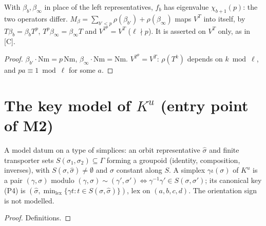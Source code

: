 \begin{proposition}\label{prop:bdrychar-2}
  \leanok
  With $\beta_b,\beta_\infty$ in place of the left representatives, $f_b$ has eigenvalue $\chi_{b+1}(p)$: the two operators
  differ. $M_\beta=\sum_{b'<p}\rho(\beta_{b'})+\rho(\beta_\infty)$ maps $V^T$ into itself, by $T\beta_b=\beta_bT^p$,
  $T^p\beta_\infty=\beta_\infty T$ and $V^{T^p}=V^T$ ($\ell\nmid p$). It is asserted on $V^T$ only, as in [C].
\end{proposition}
\begin{proof}
  \leanok
  $\beta_{b'}\cdot\mathrm{Nm}=p\,\mathrm{Nm}$, $\beta_\infty\cdot\mathrm{Nm}=\mathrm{Nm}$. $V^{T^p}=V^T$: $\rho(T^k)$ depends on $k\bmod\ell$, and
  $pa\equiv1\bmod\ell$ for some $a$.
\end{proof}

\section{The key model of $K^u$ (entry point of M2)}

\begin{definition}\label{def:keymodel}
  \leanok
  A model datum on a type of simplices: an orbit representative $\hat\sigma$ and finite transporter sets
  $S(\sigma_1,\sigma_2)\subseteq\Gamma$ forming a groupoid (identity, composition, inverses), with $S(\sigma,\hat\sigma)\ne\emptyset$ and
  $\hat\sigma$ constant along $S$. A simplex $\gamma\iota(\sigma)$ of $K^u$ is a pair $(\gamma,\sigma)$ modulo
  $(\gamma,\sigma)\sim(\gamma',\sigma')\iff\gamma^{-1}\gamma'\in S(\sigma,\sigma')$; its canonical key (P4) is
  $(\hat\sigma,\min_{\mathrm{lex}}\{\gamma t:t\in S(\sigma,\hat\sigma)\})$, $\mathrm{lex}$ on $(a,b,c,d)$. The orientation sign is not modelled.
\end{definition}
\begin{proof}
  \leanok
  Definitions.
\end{proof}

